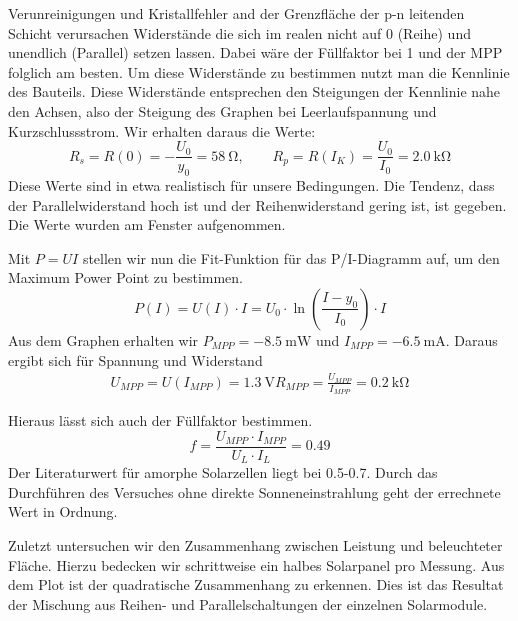 Verunreinigungen und Kristallfehler and der Grenzfläche der p-n leitenden Schicht verursachen Widerstände die sich im realen nicht auf 0 (Reihe) und unendlich (Parallel) setzen lassen.
Dabei wäre der Füllfaktor bei 1 und der MPP folglich am besten.
Um diese Widerstände zu bestimmen nutzt man die Kennlinie des Bauteils.
Diese Widerstände entsprechen den Steigungen der Kennlinie nahe den Achsen, also der Steigung des Graphen bei Leerlaufspannung und Kurzschlussstrom.
Wir erhalten daraus die Werte:
\[
R_s=R(0)=-\frac{U_0}{y_0}=\SI{58}{\ohm}, \qquad
R_p=R(I_K)=\frac{U_0}{I_0}=\SI{2,0}{\kilo \ohm}
\]
Diese Werte sind in etwa realistisch für unsere Bedingungen. Die Tendenz, dass der Parallelwiderstand hoch ist und der Reihenwiderstand gering ist, ist gegeben. Die Werte wurden am Fenster aufgenommen.

Mit $P=UI$ stellen wir nun die Fit-Funktion für das P/I-Diagramm auf, um den Maximum Power Point zu bestimmen.
\[
	P(I)=U(I) \cdot I=U_0 \cdot \ln \left( \frac{I-y_0}{I_0} \right) \cdot I
\]
Aus dem Graphen erhalten wir $P_{MPP}= \SI{-8,5}{\milli \watt}$ und $I_{MPP} = \SI{-6,5}{\milli \ampere}$.
Daraus ergibt sich für Spannung und Widerstand
\begin{align*}
	U_{MPP} = U(I_{MPP}) = \SI{1,3}{\volt}
	R_{MPP} = \frac{U_{MPP}}{I_{MPP}} = \SI{0,2}{\kilo \ohm}
\end{align*}

Hieraus lässt sich auch der Füllfaktor bestimmen.
\[
	f= \frac{U_{MPP} \cdot I_{MPP}}{U_L \cdot I_L} = 0.49
\]
Der Literaturwert für amorphe Solarzellen liegt bei 0.5-0.7. Durch das Durchführen des Versuches ohne direkte Sonneneinstrahlung geht der errechnete Wert in Ordnung.

Zuletzt untersuchen wir den Zusammenhang zwischen Leistung und beleuchteter Fläche. Hierzu bedecken wir schrittweise ein halbes Solarpanel pro Messung. Aus dem Plot  ist der quadratische Zusammenhang zu erkennen. Dies ist das Resultat der Mischung aus Reihen- und Parallelschaltungen der einzelnen Solarmodule. 
